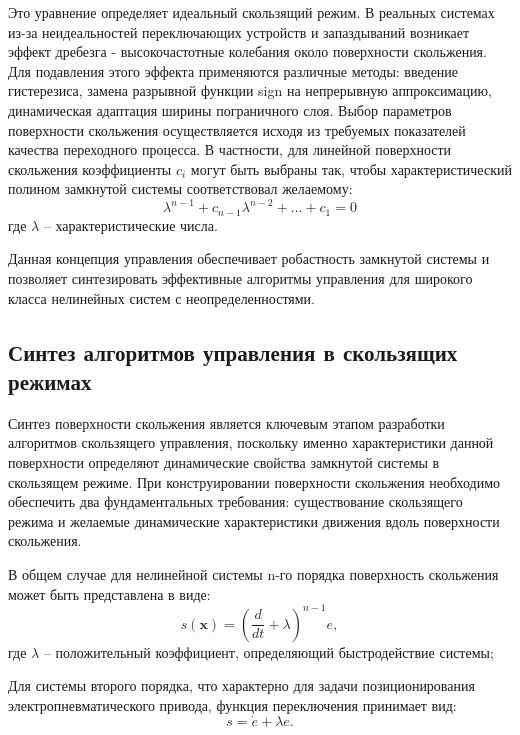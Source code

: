 Это уравнение определяет идеальный скользящий режим. В реальных системах из-за неидеальностей
переключающих устройств и запаздываний возникает эффект дребезга - высокочастотные колебания около
поверхности скольжения. Для подавления этого эффекта применяются различные методы: введение гистерезиса,
замена разрывной функции sign на непрерывную аппроксимацию, динамическая адаптация ширины пограничного слоя.
Выбор параметров поверхности скольжения осуществляется исходя из требуемых показателей
качества переходного процесса. В частности, для линейной поверхности скольжения
коэффициенты $c_i$ могут быть выбраны так, чтобы характеристический полином замкнутой системы соответствовал желаемому:
\begin{equation*}
	\lambda^{n-1} + c_{n-1}\lambda^{n-2} + \ldots + c_1 = 0
\end{equation*}
где $\lambda$ -- характеристические числа.

Данная концепция управления обеспечивает робастность замкнутой системы и позволяет синтезировать
эффективные алгоритмы управления для широкого класса нелинейных систем с неопределенностями.

\subsection{Синтез алгоритмов управления в скользящих режимах}\label{subsec:ch3/sec3/sub2}

Синтез поверхности скольжения является ключевым этапом разработки алгоритмов
скользящего управления, поскольку именно характеристики данной поверхности определяют
динамические свойства замкнутой системы в скользящем режиме. При конструировании поверхности
скольжения необходимо обеспечить два фундаментальных требования: существование скользящего режима
и желаемые динамические характеристики движения вдоль поверхности скольжения.

В общем случае для нелинейной системы n-го порядка поверхность скольжения может быть представлена в виде:
\begin{equation*}
	s(\mathbf{x}) = \left(\frac{d}{dt} + \lambda\right)^{n-1}e,
\end{equation*}
где $\lambda$ -- положительный коэффициент, определяющий быстродействие системы;

Для системы второго порядка, что характерно для задачи позиционирования электропневматического
привода, функция переключения принимает вид:
\begin{equation*}
	s = \dot{e} + \lambda e.
\end{equation*}

